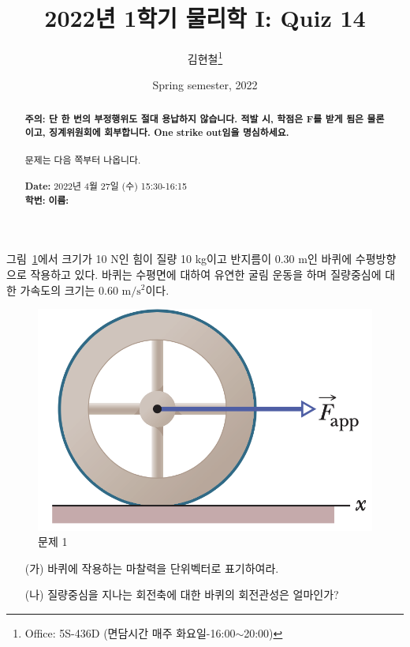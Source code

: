 \documentclass[floatfix,nofootinbib,superscriptaddress,fleqn,preprint]{revtex4}
\begin{document}
\title{\Large 2022년 1학기 물리학 I: Quiz 14}
\author{김현철\footnote{Office: 5S-436D (면담시간 매주
    화요일-16:00$\sim$20:00)}} 
\date{Spring semester, 2022}


\vspace{1.cm}
\begin{abstract}
\noindent \textbf{ {\color{red}주의}: \color{blue} 단 한 번의 부정행위도 절대
  용납하지 않습니다. 적발 시, 학점은 F를 받게 됨은 물론이고,
  징계위원회에 회부합니다. One strike out임을 명심하세요.}\\
\\
문제는 다음 쪽부터 나옵니다.  \\ \\
{\bf Date:} 2022년 4월 27일 (수) 15:30-16:15
\\
{\bf 학번:} \hspace{4cm}
{\bf 이름:} 

\end{abstract}
\maketitle

그림~\ref{fig:1}에서 크기가 10 N인 힘이 질량 10 kg이고 반지름이 0.30
m인 바퀴에 수평방향으로 작용하고 있다. 바퀴는 수평면에 대하여 유연한
굴림 운동을 하며 질량중심에 대한 가속도의 크기는 0.60
$\mathrm{m/s^2}$이다. 
\begin{figure}[htp]
  \centering
\includegraphics[scale=0.5]{Qfig14-1-20220427.png}
  \caption{문제 1}
  \label{fig:1}
\end{figure}
\begin{itemize}
\item[(가)] 바퀴에 작용하는 마찰력을 단위벡터로 표기하여라.
\item[(나)] 질량중심을 지나는 회전축에 대한 바퀴의 회전관성은
  얼마인가?   
\end{itemize}
\end{document}
